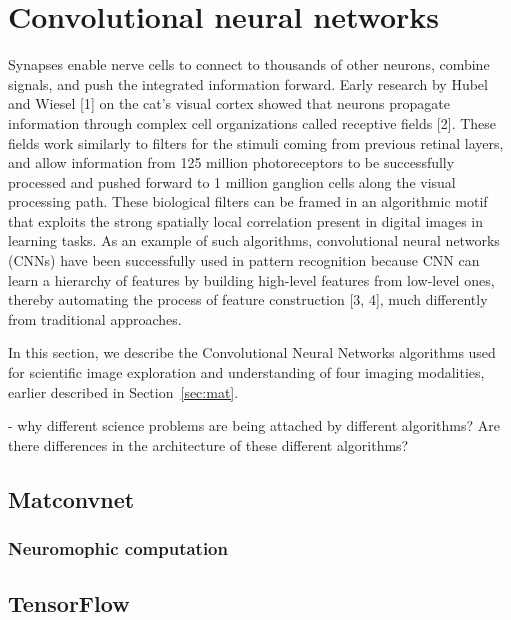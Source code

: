 \section{Convolutional neural networks}\label{sec:met}
Synapses enable nerve cells to connect to thousands of other neurons, combine signals, and push the integrated information forward. Early research by Hubel and Wiesel [1] on the cat’s visual cortex showed that neurons propagate information through complex cell organizations called receptive fields [2]. These fields work similarly to filters for the stimuli coming from previous retinal layers, and allow information from 125 million photoreceptors to be successfully processed and pushed forward to 1 million ganglion cells along the visual processing path. These biological filters can be framed in an algorithmic motif that exploits the strong spatially local correlation present in digital images in learning tasks. As an example of such algorithms, convolutional neural networks (CNNs) have been successfully used in pattern recognition because CNN can learn a hierarchy of features by building high-level features from low-level ones, thereby automating the process of feature construction [3, 4], much differently from traditional approaches.

In this section, we describe the Convolutional Neural Networks algorithms used for scientific image exploration and understanding of four imaging modalities, earlier described in Section~\ref{sec:mat}.

- why different science problems are being attached by different algorithms? Are there differences in the architecture of these different algorithms?


\subsection{Matconvnet}

\subsubsection{Neuromophic computation}


\subsection{TensorFlow}
